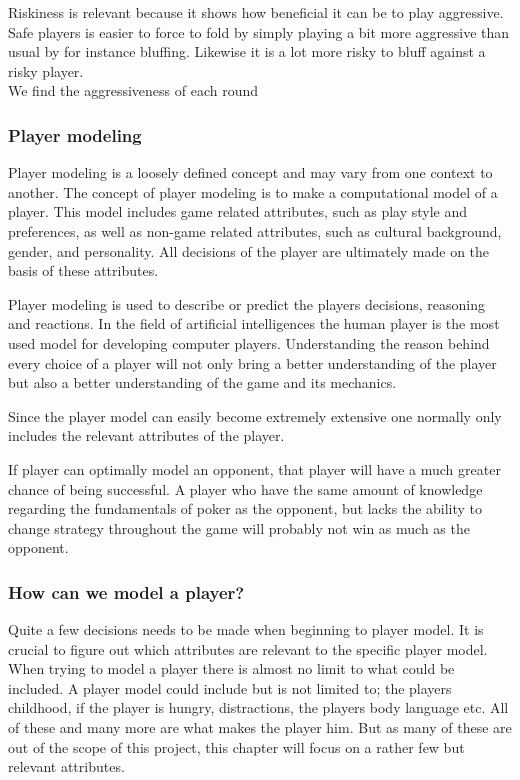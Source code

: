 Riskiness is relevant because it shows how beneficial it can be to play aggressive. Safe players is easier to force to fold by simply playing a bit more aggressive than usual by for instance bluffing. Likewise it is a lot more risky to bluff against a risky player.\\

We find the aggressiveness of each round 

\subsubsection{Player modeling}
\label{sec:pm}
Player modeling is a loosely defined concept and may vary from one context to another. The concept of player modeling is to make a computational model of a player. This model includes game related attributes, such as play style and preferences, as well as non-game related attributes, such as cultural background, gender, and personality. All decisions of the player are ultimately made on the basis of these attributes. 

Player modeling is used to describe or predict the players decisions, reasoning and reactions. In the field of artificial intelligences the human player is the most used model for developing computer players. Understanding the reason behind every choice of a player will not only bring a better understanding of the player but also a better understanding of the game and its mechanics.

Since the player model can easily become extremely extensive one normally only includes the relevant attributes of the player.

If player can optimally model an opponent, that player will have a much greater chance of being successful. A player who have the same amount of knowledge regarding the fundamentals of poker as the opponent, but lacks the ability to change strategy throughout the game will probably not win as much as the opponent.

\subsubsection{How can we model a player?}
Quite a few decisions needs to be made when beginning to player model. It is crucial to figure out which attributes are relevant to the specific player model. When trying to model a player there is almost no limit to what could be included. A player model could include but is not limited to; the players childhood, if the player is hungry, distractions, the players body language etc. All of these and many more are what makes the player him. But as many of these are out of the scope of this project, this chapter will focus on a rather few but relevant attributes. 

